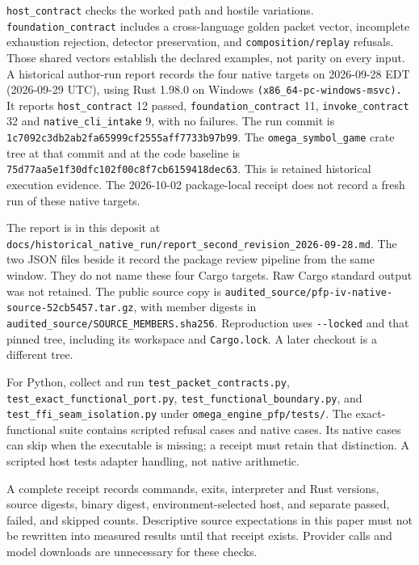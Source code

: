 \documentclass[
  11pt,
]{article}
\newcommand{\passthrough}[1]{#1}
\begin{document}
\nolinkurl{host_contract} checks the worked path and hostile variations.
\nolinkurl{foundation_contract} includes a cross-language golden packet
vector, incomplete exhaustion rejection, detector preservation, and
\nolinkurl{composition/replay} refusals. Those shared vectors establish
the declared examples, not parity on every input. A historical
author-run report records the four native targets on 2026-09-28 EDT
(2026-09-29 UTC), using Rust 1.98.0 on Windows
\nolinkurl{(x86_64-pc-windows-msvc).} It reports
\nolinkurl{host_contract} 12 passed, \nolinkurl{foundation_contract} 11,
\nolinkurl{invoke_contract} 32 and \nolinkurl{native_cli_intake} 9, with
no failures. The run commit is
\nolinkurl{1c7092c3db2ab2fa65999cf2555aff7733b97b99}. The
\nolinkurl{omega_symbol_game} crate tree at that commit and at the code
baseline is \nolinkurl{75d77aa5e1f30dfc102f00c8f7cb6159418dec63}. This
is retained historical execution evidence. The 2026-10-02 package-local
receipt does not record a fresh run of these native targets.

The report is in this deposit at
\nolinkurl{docs/historical_native_run/report_second_revision_2026-09-28.md}.
The two JSON files beside it record the package review pipeline from the
same window. They do not name these four Cargo targets. Raw Cargo
standard output was not retained. The public source copy is
\nolinkurl{audited_source/pfp-iv-native-source-52cb5457.tar.gz}, with
member digests in \nolinkurl{audited_source/SOURCE_MEMBERS.sha256}.
Reproduction uses \passthrough{\lstinline!--locked!} and that pinned
tree, including its workspace and \passthrough{\lstinline!Cargo.lock!}.
A later checkout is a different tree.

For Python, collect and run \nolinkurl{test_packet_contracts.py},
\nolinkurl{test_exact_functional_port.py},
\nolinkurl{test_functional_boundary.py}, and
\nolinkurl{test_ffi_seam_isolation.py} under
\nolinkurl{omega_engine_pfp/tests/}. The exact-functional suite contains
scripted refusal cases and native cases. Its native cases can skip when
the executable is missing; a receipt must retain that distinction. A
scripted host tests adapter handling, not native arithmetic.

A complete receipt records commands, exits, interpreter and Rust
versions, source digests, binary digest, environment-selected host, and
separate passed, failed, and skipped counts. Descriptive source
expectations in this paper must not be rewritten into measured results
until that receipt exists. Provider calls and model downloads are
unnecessary for these checks.
\end{document}
